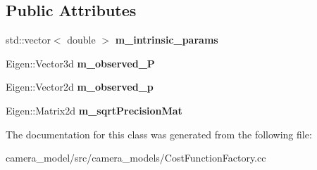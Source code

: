 \subsection*{Public Attributes}
\begin{DoxyCompactItemize}
\item 
\mbox{\label{classcamodocal_1_1ReprojectionError1_a1624e7d4a7a9bed987bb4e17ee116666}} 
std\+::vector$<$ double $>$ {\bfseries m\+\_\+intrinsic\+\_\+params}
\item 
\mbox{\label{classcamodocal_1_1ReprojectionError1_a7ac66bc3e242cc98deab09e74a1db1e9}} 
Eigen\+::\+Vector3d {\bfseries m\+\_\+observed\+\_\+P}
\item 
\mbox{\label{classcamodocal_1_1ReprojectionError1_a1faf79def1cfeeb3b46f12b989723f43}} 
Eigen\+::\+Vector2d {\bfseries m\+\_\+observed\+\_\+p}
\item 
\mbox{\label{classcamodocal_1_1ReprojectionError1_aeb2f5b9de13cf9afd70cd15065714b4e}} 
Eigen\+::\+Matrix2d {\bfseries m\+\_\+sqrt\+Precision\+Mat}
\end{DoxyCompactItemize}


The documentation for this class was generated from the following file\+:\begin{DoxyCompactItemize}
\item 
camera\+\_\+model/src/camera\+\_\+models/Cost\+Function\+Factory.\+cc\end{DoxyCompactItemize}
